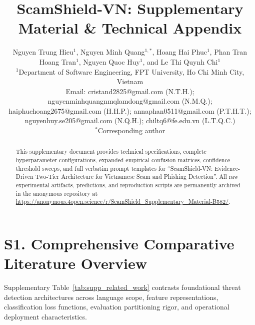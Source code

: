 \documentclass[journal]{IEEEtran}
\begin{document}
\title{ScamShield-VN: Supplementary Material \& Technical Appendix}

\author{
    Nguyen Trung Hieu$^{1}$,
    Nguyen Minh Quang$^{1,*}$,
    Hoang Hai Phuc$^{1}$,
    Phan Tran Hoang Tran$^{1}$,
    Nguyen Quoc Huy$^{1}$, and
    Le Thi Quynh Chi$^{1}$\\[0.4em]
    $^{1}$Department of Software Engineering, FPT University, Ho Chi Minh City, Vietnam\\[0.2em]
    Email: cristand2825@gmail.com (N.T.H.); nguyenminhquangnmqlamdong@gmail.com (N.M.Q.);\\
    haiphuchoang2675@gmail.com (H.H.P.); annaphan0511@gmail.com (P.T.H.T.);\\
    nguyenhuy.se205@gmail.com (N.Q.H.); chiltq6@fe.edu.vn (L.T.Q.C.)\\[0.2em]
    $^*$Corresponding author
}

\maketitle

\begin{abstract}
This supplementary document provides technical specifications, complete hyperparameter configurations, expanded empirical confusion matrices, confidence threshold sweeps, and full verbatim prompt templates for ``ScamShield-VN: Evidence-Driven Two-Tier Architecture for Vietnamese Scam and Phishing Detection''. All raw experimental artifacts, predictions, and reproduction scripts are permanently archived in the anonymous repository at \url{https://anonymous.4open.science/r/ScamShield_Supplementary_Material-B582/}.
\end{abstract}

\section{S1. Comprehensive Comparative Literature Overview}
\label{sec:supp_lit}

Supplementary Table~\ref{tab:supp_related_work} contrasts foundational threat detection architectures across language scope, feature representations, classification loss functions, evaluation partitioning rigor, and operational deployment characteristics.
\end{document}
